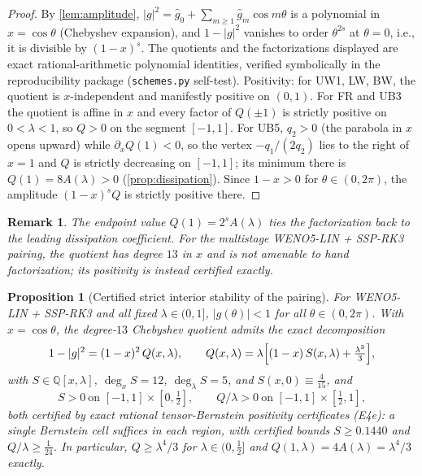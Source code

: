 \documentclass[pdflatex,sn-mathphys-num]{sn-jnl}%
\theoremstyle{thmstyleone}%
\newtheorem{proposition}{Proposition}%
\theoremstyle{thmstyletwo}%
\newtheorem{remark}{Remark}%
\theoremstyle{thmstylethree}%
\begin{document}
\begin{proof}
By \cref{lem:amplitude}, $|g|^2=\hat g_0+\sum_{m\ge1}\hat g_m\cos m\theta$ is a polynomial in $x=\cos\theta$ (Chebyshev expansion), and $1-|g|^2$ vanishes to order $\theta^{2s}$ at $\theta=0$, i.e., it is divisible by $(1-x)^s$.
The quotients and the factorizations displayed are exact rational-arithmetic polynomial identities, verified symbolically in the reproducibility package (\texttt{schemes.py} self-test).
Positivity: for UW1, LW, BW, the quotient is $x$-independent and manifestly positive on $(0,1)$.
For FR and UB3 the quotient is affine in $x$ and every factor of $Q(\pm1)$ is strictly positive on $0<\lambda<1$, so $Q>0$ on the segment $[-1,1]$.
For UB5, $q_2>0$ (the parabola in $x$ opens upward) while $\partial_xQ(1)<0$, so the vertex $-q_1/(2q_2)$ lies to the right of $x=1$ and $Q$ is strictly decreasing on $[-1,1]$; its minimum there is $Q(1)=8A(\lambda)>0$ (\cref{prop:dissipation}).
Since $1-x>0$ for $\theta\in(0,2\pi)$, the amplitude $(1-x)^sQ$ is strictly positive there.
\end{proof}

\begin{remark}
The endpoint value $Q(1)=2^sA(\lambda)$ ties the factorization back to the leading dissipation coefficient.
For the multistage WENO5-LIN + SSP-RK3 pairing, the quotient has degree $13$ in $x$ and is not amenable to hand factorization; its positivity is instead certified exactly.
\end{remark}

\begin{proposition}[Certified strict interior stability of the pairing]\label{prop:rk3-stability}
For WENO5-LIN + SSP-RK3 and all fixed $\lambda\in(0,1]$, $|g(\theta)|<1$ for all $\theta\in(0,2\pi)$.
With $x=\cos\theta$, the degree-$13$ Chebyshev quotient admits the exact decomposition \[ 1-|g|^2=(1-x)^2\,Q(x,\lambda), \qquad Q(x,\lambda) = \lambda\Bigl[(1-x)\,S(x,\lambda)+\tfrac{\lambda^3}{3}\Bigr], \] with $S\in\mathbb Q[x,\lambda]$, $\deg_xS=12$, $\deg_\lambda S=5$, and $S(x,0)\equiv\tfrac{4}{15}$, and \[ S>0\ \text{on }[-1,1]\times[0,\tfrac12], \qquad Q/\lambda>0\ \text{on }[-1,1]\times[\tfrac12,1], \] both certified by exact rational tensor-Bernstein positivity certificates (E4e): a single Bernstein cell suffices in each region, with certified bounds $S\ge0.1440$ and $Q/\lambda\ge\tfrac1{24}$.
In particular, $Q\ge\lambda^4/3$ for $\lambda\in(0,\tfrac12]$ and $Q(1,\lambda)=4A(\lambda)=\lambda^4/3$ exactly.
\end{proposition}
\end{document}
